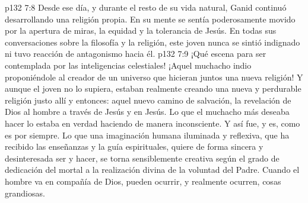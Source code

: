 \vs p132 7:8 Desde ese día, y durante el resto de su vida natural, Ganid continuó desarrollando una religión propia. En su mente se sentía poderosamente movido por la apertura de miras, la equidad y la tolerancia de Jesús. En todas sus conversaciones sobre la filosofía y la religión, este joven nunca se sintió indignado ni tuvo reacción de antagonismo hacia él.
\vs p132 7:9 \pc ¡Qué escena para ser contemplada por las inteligencias celestiales! ¡Aquel muchacho indio proponiéndole al creador de un universo que hicieran juntos una nueva religión! Y aunque el joven no lo supiera, estaban realmente creando una nueva y perdurable religión justo allí y entonces: aquel nuevo camino de salvación, la revelación de Dios al hombre a través de Jesús y en Jesús. Lo que el muchacho más deseaba hacer lo estaba en verdad haciendo de manera inconsciente. Y así fue, y es, como es por siempre. Lo que una imaginación humana iluminada y reflexiva, que ha recibido las enseñanzas y la guía espirituales, quiere de forma sincera y desinteresada ser y hacer, se torna sensiblemente creativa según el grado de dedicación del mortal a la realización divina de la voluntad del Padre. Cuando el hombre va en compañía de Dios, pueden ocurrir, y realmente ocurren, cosas grandiosas.
